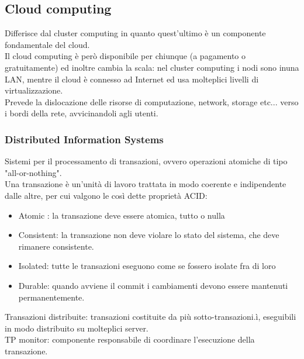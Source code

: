 \documentclass[16px]{article}
\begin{document}
\subsection{Cloud computing}
Differisce dal cluster computing in quanto quest'ultimo è un componente fondamentale del cloud.\\ Il cloud computing è però disponibile per chiunque (a pagamento o gratuitamente) ed inoltre cambia la scala: nel cluster computing i nodi sono inuna LAN, mentre il cloud è connesso ad Internet ed usa molteplici livelli di virtualizzazione.\\ Prevede la dislocazione delle risorse di computazione, network, storage etc... verso i bordi della rete, avvicinandoli agli utenti.
\subsubsection{Distributed Information Systems}
Sistemi per il processamento di transazioni, ovvero operazioni atomiche di tipo "all-or-nothing".\\ Una transazione è un'unità di lavoro trattata in modo coerente e indipendente dalle altre, per cui valgono le così dette proprietà ACID:
\begin{itemize}
\item Atomic : la transazione deve essere atomica, tutto o nulla
\item Consistent: la transazione non deve violare lo stato del sistema, che deve rimanere consistente.
\item Isolated: tutte le transazioni eseguono come se fossero isolate fra di loro
\item Durable: quando avviene il commit i cambiamenti devono essere mantenuti permanentemente.
\end{itemize}
Transazioni distribuite: transazioni costituite da più sotto-transazioni.ì, eseguibili in modo distribuito su molteplici server.\\ TP monitor: componente responsabile di coordinare l'esecuzione della transazione.
\end{document}
